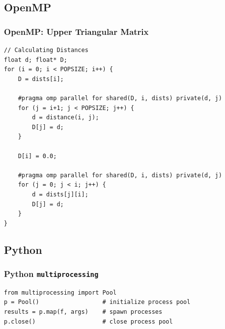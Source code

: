 \documentclass[t]{beamer}
\begin{document}
\subsection{OpenMP}
\begin{frame}[fragile]
\frametitle{OpenMP: Upper Triangular Matrix}
\begin{verbatim}
// Calculating Distances
float d; float* D;
for (i = 0; i < POPSIZE; i++) {
    D = dists[i];

    #pragma omp parallel for shared(D, i, dists) private(d, j)
    for (j = i+1; j < POPSIZE; j++) {
        d = distance(i, j);
        D[j] = d;
    }
    
    D[i] = 0.0;
    
    #pragma omp parallel for shared(D, i, dists) private(d, j)
    for (j = 0; j < i; j++) {
        d = dists[j][i];
        D[j] = d;
    }
}
\end{verbatim}
\end{frame}

\subsection{Python}
\begin{frame}[fragile]
\frametitle{Python \texttt{multiprocessing}}
\begin{verbatim}
from multiprocessing import Pool
p = Pool()                  # initialize process pool
results = p.map(f, args)    # spawn processes
p.close()                   # close process pool 
\end{verbatim}
\end{frame}
\end{document}
